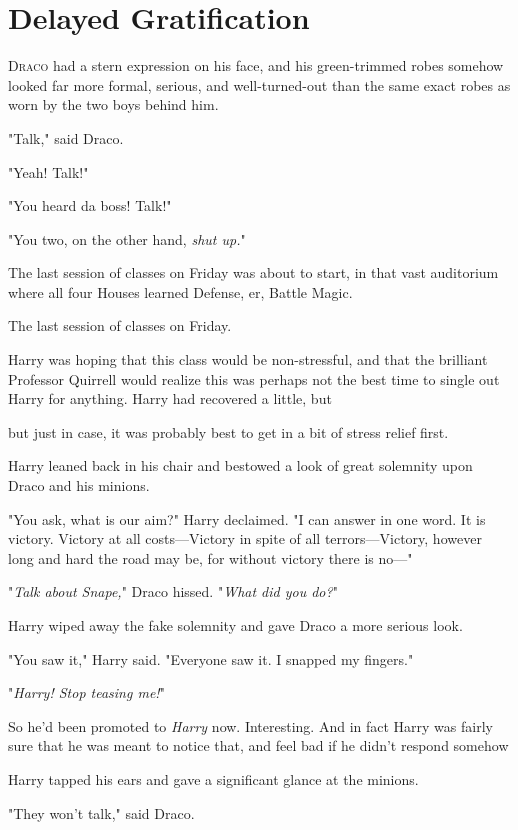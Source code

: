 \chapter{Delayed Gratification}

\lettrine{D}{raco} had a stern expression on his face, and his green-trimmed robes somehow
looked far more formal, serious, and well-turned-out than the same exact robes
as worn by the two boys behind him.

"Talk," said Draco.

"Yeah! Talk!"

"You heard da boss! Talk!"

"You two, on the other hand, \emph{shut up.}"

The last session of classes on Friday was about to start, in that vast
auditorium where all four Houses learned Defense, er, Battle Magic.

The last session of classes on Friday.

Harry was hoping that this class would be non-stressful, and that the brilliant
Professor Quirrell would realize this was perhaps not the best time to single
out Harry for anything. Harry had recovered a little, but{\el}

{\el} but just in case, it was probably best to get in a bit of stress relief
first.

Harry leaned back in his chair and bestowed a look of great solemnity upon
Draco and his minions.

"You ask, what is our aim?" Harry declaimed. "I can answer in one word. It is
victory. Victory at all costs---Victory in spite of all terrors---Victory,
however long and hard the road may be, for without victory there is no\mbox{---}"

"\emph{Talk about Snape,}" Draco hissed. "\emph{What did you do?}"

Harry wiped away the fake solemnity and gave Draco a more serious look.

"You saw it," Harry said. "Everyone saw it. I snapped my fingers."

"\emph{Harry! Stop teasing me!}"

So he'd been promoted to \emph{Harry} now. Interesting. And in fact Harry was
fairly sure that he was meant to notice that, and feel bad if he didn't respond
somehow{\el}

Harry tapped his ears and gave a significant glance at the minions.

"They won't talk," said Draco.

